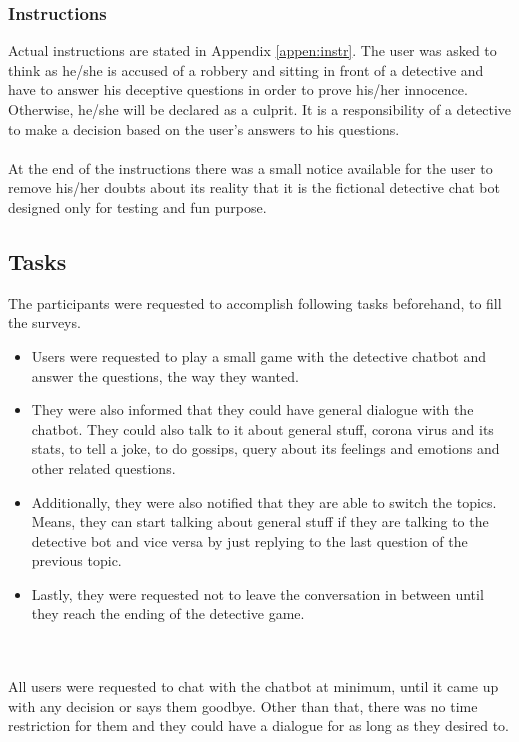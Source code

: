 \subsubsection*{Instructions}
Actual instructions are stated in Appendix \ref{appen:instr}. The user was asked to think as he/she is accused of a robbery and sitting in front of a detective and have to answer his deceptive questions in order to prove his/her innocence. Otherwise, he/she will be declared as a culprit. It is a responsibility of a detective to make a decision based on the user's answers to his questions.
\\~\\
At the end of the instructions there was a small notice available for the user to remove his/her doubts about its reality that it is the fictional detective chat bot designed only for testing and fun purpose.

\subsection{Tasks}
The participants were requested to accomplish following tasks beforehand, to fill the surveys.
\begin{itemize}
    \item Users were requested to play a small game with the detective chatbot and answer the questions, the way they wanted.
    \item They were also informed that they could have general dialogue with the chatbot. They could also talk to it about general stuff, corona virus and its stats, to tell a joke, to do gossips, query about its feelings and emotions and other related questions.
    \item Additionally, they were also notified that they are able to switch the topics. Means, they can start talking about general stuff if they are talking to the detective bot and vice versa by just replying to the last question of the previous topic.
    \item Lastly, they were requested not to leave the conversation in between until they reach the ending of the detective game. 
\end{itemize} 
\\~\\
All users were requested to chat with the chatbot at minimum, until it came up with any decision or says them goodbye. Other than that, there was no time restriction for them and they could have a dialogue for as long as they desired to.

